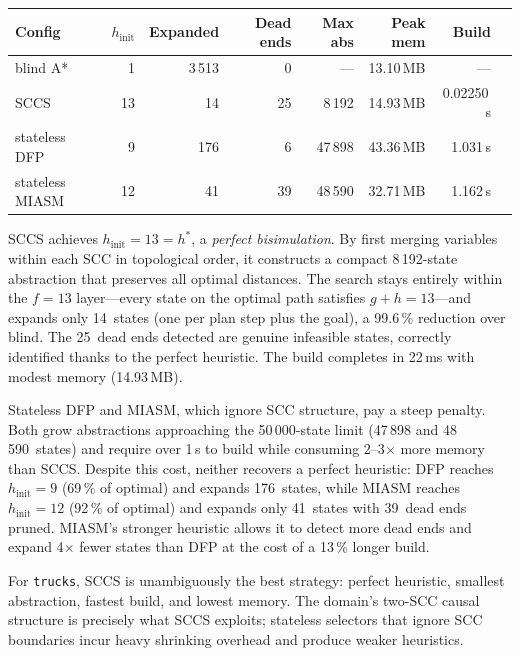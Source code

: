 \documentclass[11pt,a4paper]{article}
\begin{document}
\begin{center}
\small
\begin{tabular}{lrrrrrrr}
\toprule
\textbf{Config} & \textbf{$h_{\mathrm{init}}$} & \textbf{Expanded}
  & \textbf{Dead ends} & \textbf{Max abs} & \textbf{Peak mem} & \textbf{Build} \\
\midrule
blind A*            &  1 & 3\,513 &  0 & ---     & 13.10\,MB & ---       \\
SCCS                & 13 &     14 & 25 & 8\,192  & 14.93\,MB & 0.02250\,s  \\
stateless DFP       &  9 &    176 &  6 & 47\,898 & 43.36\,MB & 1.031\,s  \\
stateless MIASM     & 12 &     41 & 39 & 48\,590 & 32.71\,MB & 1.162\,s  \\
\bottomrule
\end{tabular}
\end{center}

SCCS achieves $h_{\mathrm{init}} = 13 = h^*$, a \emph{perfect bisimulation}.
By first merging variables within each SCC in topological order, it constructs
a compact 8\,192-state abstraction that preserves all optimal distances.
The search stays entirely within the $f = 13$ layer---every state on the
optimal path satisfies $g + h = 13$---and expands only 14~states (one per
plan step plus the goal), a 99.6\,\% reduction over blind.
The 25~dead ends detected are genuine infeasible states, correctly identified
thanks to the perfect heuristic.
The build completes in 22\,ms with modest memory (14.93\,MB).

Stateless DFP and MIASM, which ignore SCC structure, pay a steep penalty.
Both grow abstractions approaching the 50\,000-state limit (47\,898 and
48\,590~states) and require over 1\,s to build while consuming 2--3$\times$
more memory than SCCS.
Despite this cost, neither recovers a perfect heuristic: DFP reaches
$h_{\mathrm{init}} = 9$ (69\,\% of optimal) and expands 176~states, while
MIASM reaches $h_{\mathrm{init}} = 12$ (92\,\% of optimal) and expands only
41~states with 39~dead ends pruned.
MIASM's stronger heuristic allows it to detect more dead ends and expand
4$\times$ fewer states than DFP at the cost of a 13\,\% longer build.

For \texttt{trucks}, SCCS is unambiguously the best strategy: perfect
heuristic, smallest abstraction, fastest build, and lowest memory.
The domain's two-SCC causal structure is precisely what SCCS exploits;
stateless selectors that ignore SCC boundaries incur heavy shrinking overhead
and produce weaker heuristics.
\end{document}
